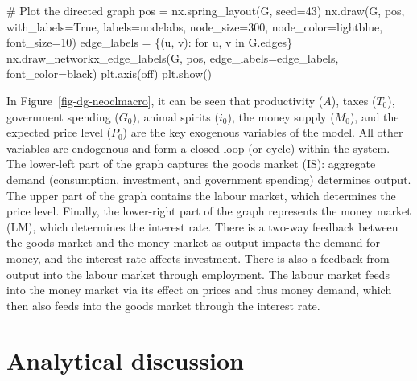 \documentclass[
  letterpaper,
  DIV=11,
  numbers=noendperiod]{scrreprt}
\newenvironment{Shaded}{\begin{snugshade}}{\end{snugshade}}
\newcommand{\CommentTok}[1]{\textcolor[rgb]{0.37,0.37,0.37}{#1}}
\newcommand{\ControlFlowTok}[1]{\textcolor[rgb]{0.00,0.23,0.31}{#1}}
\newcommand{\DecValTok}[1]{\textcolor[rgb]{0.68,0.00,0.00}{#1}}
\newcommand{\KeywordTok}[1]{\textcolor[rgb]{0.00,0.23,0.31}{#1}}
\newcommand{\NormalTok}[1]{\textcolor[rgb]{0.00,0.23,0.31}{#1}}
\newcommand{\OperatorTok}[1]{\textcolor[rgb]{0.37,0.37,0.37}{#1}}
\newcommand{\StringTok}[1]{\textcolor[rgb]{0.13,0.47,0.30}{#1}}
\newcommand{\VariableTok}[1]{\textcolor[rgb]{0.07,0.07,0.07}{#1}}
\begin{document}
\begin{tcolorbox}
\begin{Shaded}
\begin{Highlighting}[]
\CommentTok{\# Plot the directed graph}
\NormalTok{pos }\OperatorTok{=}\NormalTok{ nx.spring\_layout(G, seed}\OperatorTok{=}\DecValTok{43}\NormalTok{)  }
\NormalTok{nx.draw(G, pos, with\_labels}\OperatorTok{=}\VariableTok{True}\NormalTok{, labels}\OperatorTok{=}\NormalTok{nodelabs, node\_size}\OperatorTok{=}\DecValTok{300}\NormalTok{, node\_color}\OperatorTok{=}\StringTok{\textquotesingle{}lightblue\textquotesingle{}}\NormalTok{, }
\NormalTok{        font\_size}\OperatorTok{=}\DecValTok{10}\NormalTok{)}
\NormalTok{edge\_labels }\OperatorTok{=}\NormalTok{ \{(u, v): }\StringTok{\textquotesingle{}\textquotesingle{}} \ControlFlowTok{for}\NormalTok{ u, v }\KeywordTok{in}\NormalTok{ G.edges\}}
\NormalTok{nx.draw\_networkx\_edge\_labels(G, pos, edge\_labels}\OperatorTok{=}\NormalTok{edge\_labels, font\_color}\OperatorTok{=}\StringTok{\textquotesingle{}black\textquotesingle{}}\NormalTok{)}
\NormalTok{plt.axis(}\StringTok{\textquotesingle{}off\textquotesingle{}}\NormalTok{)}
\NormalTok{plt.show()}
\end{Highlighting}
\end{Shaded}

\end{tcolorbox}

In Figure~\ref{fig-dg-neoclmacro}, it can be seen that productivity
(\(A\)), taxes (\(T_0\)), government spending (\(G_0\)), animal spirits
(\(i_0\)), the money supply (\(M_0\)), and the expected price level
(\(P_0\)) are the key exogenous variables of the model. All other
variables are endogenous and form a closed loop (or cycle) within the
system. The lower-left part of the graph captures the goods market (IS):
aggregate demand (consumption, investment, and government spending)
determines output. The upper part of the graph contains the labour
market, which determines the price level. Finally, the lower-right part
of the graph represents the money market (LM), which determines the
interest rate. There is a two-way feedback between the goods market and
the money market as output impacts the demand for money, and the
interest rate affects investment. There is also a feedback from output
into the labour market through employment. The labour market feeds into
the money market via its effect on prices and thus money demand, which
then also feeds into the goods market through the interest rate.

\section{Analytical discussion}\label{analytical-discussion-1}
\end{document}
